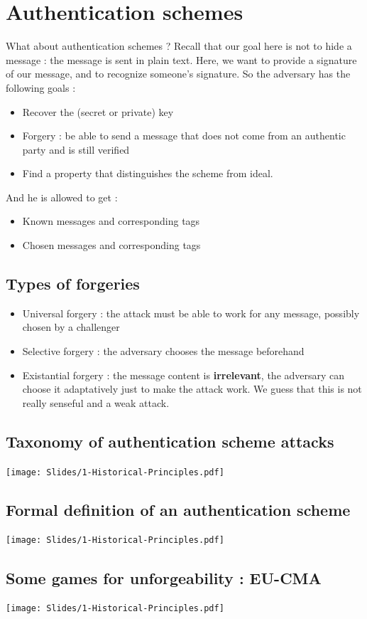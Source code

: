 \documentclass[a4paper, 12pt]{book}
\begin{document}
\section{Authentication schemes}
What about authentication schemes ? Recall that our goal here is not to hide a message : the message is sent in plain text. Here, we want to provide a signature of our message, and to recognize someone's signature. So the adversary has the following goals :
\begin{itemize}
    \item Recover the (secret or private) key
    \item Forgery : be able to send a message that does not come from an authentic party and is still verified
    \item Find a property that distinguishes the scheme from ideal.
\end{itemize}

And he is allowed to get :
\begin{itemize}
    \item Known messages and corresponding tags 
    \item Chosen messages and corresponding tags
\end{itemize}

\subsection{Types of forgeries}
\begin{itemize}
    \item Universal forgery : the attack must be able to work for any message, possibly chosen by a challenger 
    \item Selective forgery : the adversary chooses the message beforehand
    \item Existantial forgery : the message content is \textbf{irrelevant}, the adversary can choose it adaptatively just to make the attack work. We guess that this is not really senseful and a weak attack.
\end{itemize}

\subsection{Taxonomy of authentication scheme attacks}
\begin{center}
    \texttt{[image: Slides/1-Historical-Principles.pdf]}
\end{center}

\subsection{Formal definition of an authentication scheme}
\begin{center}
    \texttt{[image: Slides/1-Historical-Principles.pdf]}
\end{center}

\subsection{Some games for unforgeability : EU-CMA}
\begin{center}
    \texttt{[image: Slides/1-Historical-Principles.pdf]}
\end{center}
\end{document}
